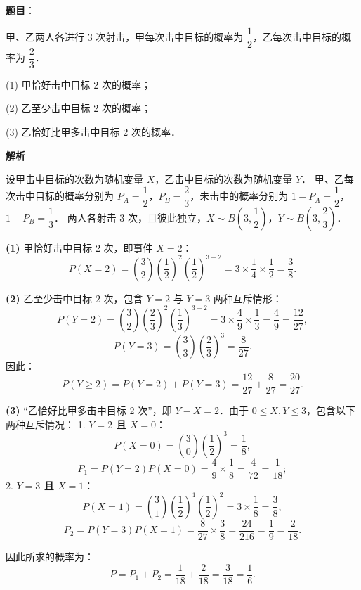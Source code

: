 \begin{answer}

\textbf{题目}：

甲、乙两人各进行 3 次射击，甲每次击中目标的概率为 $\dfrac{1}{2}$，乙每次击中目标的概率为 $\dfrac{2}{3}$．

(1) 甲恰好击中目标 2 次的概率；

(2) 乙至少击中目标 2 次的概率；

(3) 乙恰好比甲多击中目标 2 次的概率．

\textbf{解析}

设甲击中目标的次数为随机变量 $X$，乙击中目标的次数为随机变量 $Y$．
甲、乙每次击中目标的概率分别为 $P_A = \dfrac{1}{2}$，$P_B = \dfrac{2}{3}$，未击中的概率分别为 $1 - P_A = \dfrac{1}{2}$，$1 - P_B = \dfrac{1}{3}$．
两人各射击 3 次，且彼此独立，$X \sim B\left(3, \dfrac{1}{2}\right)$，$Y \sim B\left(3, \dfrac{2}{3}\right)$．

\textbf{(1)}
甲恰好击中目标 2 次，即事件 $X = 2$：
\nopagebreak[4]
\[
P(X = 2) = \binom{3}{2}\left(\frac{1}{2}\right)^2 \left(\frac{1}{2}\right)^{3-2} = 3 \times \frac{1}{4} \times \frac{1}{2} = \frac{3}{8}.
\]

\textbf{(2)}
乙至少击中目标 2 次，包含 $Y = 2$ 与 $Y = 3$ 两种互斥情形：
\nopagebreak[4]
\[
P(Y = 2) = \binom{3}{2}\left(\frac{2}{3}\right)^2 \left(\frac{1}{3}\right)^{3-2} = 3 \times \frac{4}{9} \times \frac{1}{3} = \frac{4}{9} = \frac{12}{27},
\]
\nopagebreak[4]
\[
P(Y = 3) = \binom{3}{3}\left(\frac{2}{3}\right)^3 = \frac{8}{27}.
\]
因此：
\nopagebreak[4]
\[
P(Y \geqslant 2) = P(Y = 2) + P(Y = 3) = \frac{12}{27} + \frac{8}{27} = \frac{20}{27}.
\]

\textbf{(3)}
“乙恰好比甲多击中目标 2 次”，即 $Y - X = 2$．由于 $0 \leqslant X, Y \leqslant 3$，包含以下两种互斥情况：
1. \textbf{$Y = 2$ 且 $X = 0$}：
\nopagebreak[4]
\[
P(X = 0) = \binom{3}{0}\left(\frac{1}{2}\right)^3 = \frac{1}{8},
\]
\nopagebreak[4]
\[
P_1 = P(Y = 2) P(X = 0) = \frac{4}{9} \times \frac{1}{8} = \frac{4}{72} = \frac{1}{18};
\]
2. \textbf{$Y = 3$ 且 $X = 1$}：
\nopagebreak[4]
\[
P(X = 1) = \binom{3}{1}\left(\frac{1}{2}\right)^1 \left(\frac{1}{2}\right)^2 = 3 \times \frac{1}{8} = \frac{3}{8},
\]
\nopagebreak[4]
\[
P_2 = P(Y = 3) P(X = 1) = \frac{8}{27} \times \frac{3}{8} = \frac{24}{216} = \frac{1}{9} = \frac{2}{18}.
\]

因此所求的概率为：
\nopagebreak[4]
\[
P = P_1 + P_2 = \frac{1}{18} + \frac{2}{18} = \frac{3}{18} = \frac{1}{6}.
\]




\end{answer}
